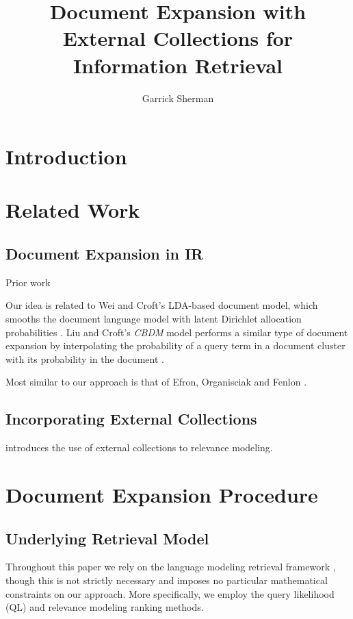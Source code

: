 \documentclass{article}
\begin{document}
\author{Garrick Sherman}

\title{Document Expansion with External Collections for Information Retrieval}

\maketitle
\begin{abstract}
\end{abstract}

\section{Introduction}\label{section.intro}

\section{Related Work}\label{section.related}

\subsection{Document Expansion in IR}\label{section.related.ir}

Prior work

Our idea is related to Wei and Croft's LDA-based document model, which smooths the document language model with latent Dirichlet allocation probabilities \cite{Wei2006}. Liu and Croft's \textit{CBDM} model performs a similar type of document expansion by interpolating the probability of a query term in a document cluster with its probability in the document \cite{Liu2004}.

Most similar to our approach is that of Efron, Organisciak and Fenlon \cite{Efron2012}.

\subsection{Incorporating External Collections}\label{section.external.collections}

\cite{Diaz2006} introduces the use of external collections to relevance modeling.

\section{Document Expansion Procedure}\label{section.expanding}

\subsection{Underlying Retrieval Model}\label{section.expanding.model}
Throughout this paper we rely on the language modeling retrieval framework \cite{Lafferty2001}, though this is not strictly necessary and imposes no particular mathematical constraints on our approach. More specifically, we employ the query likelihood (QL) and relevance modeling ranking methods. 
\end{document}
